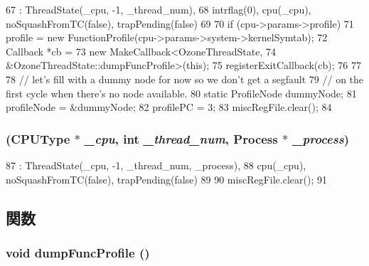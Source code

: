 \begin{DoxyCode}
67         : ThreadState(_cpu, -1, _thread_num),
68           intrflag(0), cpu(_cpu), noSquashFromTC(false), trapPending(false)
69     {
70         if (cpu->params->profile) {
71             profile = new FunctionProfile(cpu->params->system->kernelSymtab);
72             Callback *cb =
73                 new MakeCallback<OzoneThreadState,
74                 &OzoneThreadState::dumpFuncProfile>(this);
75             registerExitCallback(cb);
76         }
77 
78         // let's fill with a dummy node for now so we don't get a segfault
79         // on the first cycle when there's no node available.
80         static ProfileNode dummyNode;
81         profileNode = &dummyNode;
82         profilePC = 3;
83         miscRegFile.clear();
84     }
\end{DoxyCode}
\hypertarget{structOzoneThreadState_a2668b8773d0255979b399ca156875040}{
\subsubsection[{OzoneThreadState}]{ ({\bf CPUType} $\ast$ {\em \_\-cpu}, \/  int {\em \_\-thread\_\-num}, \/  {\bf Process} $\ast$ {\em \_\-process})}}
\label{structOzoneThreadState_a2668b8773d0255979b399ca156875040}



\begin{DoxyCode}
87         : ThreadState(_cpu, -1, _thread_num, _process),
88           cpu(_cpu), noSquashFromTC(false), trapPending(false)
89     {
90         miscRegFile.clear();
91     }
\end{DoxyCode}


\subsection{関数}
\hypertarget{structOzoneThreadState_a13fa12d1779a94a1e0b968946a1367c7}{
\subsubsection[{dumpFuncProfile}]{\setlength{\rightskip}{0pt plus 5cm}void dumpFuncProfile ()}}
\label{structOzoneThreadState_a13fa12d1779a94a1e0b968946a1367c7}


